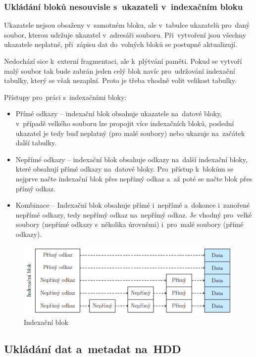 \subsubsection{Ukládání bloků nesouvisle s~ukazateli v~indexačním bloku}

Ukazatele nejsou obsaženy v~samotném bloku, ale v~tabulce ukazatelů pro~daný soubor, kterou udržuje ukazatel v~adresáři souboru. Při~vytvoření jsou všechny ukazatele neplatné, při~zápisu dat do~volných bloků se postupně aktualizují.

Nedochází sice k~externí fragmentaci, ale k~plýtvání paměti. Pokud se vytvoří malý soubor tak bude zabrán jeden celý blok navíc pro~udržování indexační tabulky, který se však nezaplní. Proto je třeba vhodně volit velikost tabulky.

Přístupy pro~práci s~indexačními bloky:
\begin{itemize}
	\item Přímé odkazy -- indexační blok obsahuje ukazatele na~datové bloky, v~případě velkého souboru lze propojit více indexačních bloků, poslední ukazatel je tedy buď neplatný (pro malé soubory) nebo ukazuje na~začátek další tabulky.
	\item Nepřímé odkazy -- indexační blok obsahuje odkazy na~další indexační bloky, které obsahují přímé odkazy na~datové bloky. Pro~přístup k~blokům se nejprve načte indexační blok přes nepřímý odkaz a~až poté se načte blok přes přímý odkaz.
	\item Kombinace -- Indexační blok obsahuje přímé i~nepřímé a~dokonce i~zanořené nepřímé odkazy, tedy nepřímý odkaz na~nepřímý odkaz. Je vhodný pro~velké soubory (nepřímé odkazy s~několika úrovněmi) i~pro~malé soubory (přímé odkazy).
\end{itemize}

\begin{figure}[ht]
	\centering
	\includegraphics[scale=1.2]{images/mem_block_index.png}
	\caption{Indexační blok}
	\label{mem_block_index}
\end{figure}

\subsection{Ukládání dat a~metadat na~HDD}

